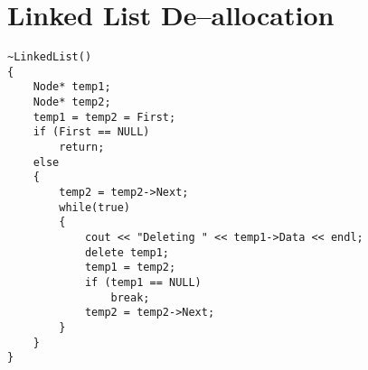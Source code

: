 \documentclass[12pt,a4paper]{article}
\begin{document}
\section{Linked List De--allocation}
\begin{lstlisting}[caption={Linked List Destructor}]
~LinkedList()
{
	Node* temp1;
	Node* temp2;
	temp1 = temp2 = First;
	if (First == NULL)
		return;
	else
	{
		temp2 = temp2->Next;
		while(true)
		{
			cout << "Deleting " << temp1->Data << endl;
			delete temp1;
			temp1 = temp2;
			if (temp1 == NULL)
				break;
			temp2 = temp2->Next;
		}
	}
}
\end{lstlisting}


\end{document}
